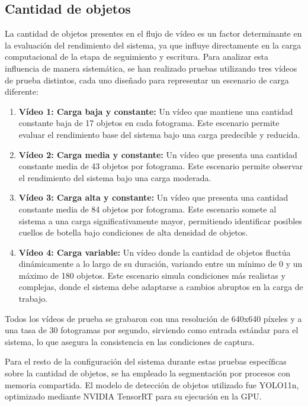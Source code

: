 \documentclass[11pt,spanish,listoffigures,listoftables]{tfgetsinf}
\begin{document}
\subsection{Cantidad de objetos} \label{sec:cantidad_objetos}
La cantidad de objetos presentes en el flujo de vídeo es un factor determinante en la evaluación del rendimiento del sistema, ya que influye directamente en la carga computacional de la etapa de seguimiento y escritura. Para analizar esta influencia de manera sistemática, se han realizado pruebas utilizando tres vídeos de prueba distintos, cada uno diseñado para representar un escenario de carga diferente:
\begin{enumerate}


   \item \textbf{Vídeo 1: Carga baja y constante:} Un vídeo que mantiene una cantidad constante baja de 17 objetos en cada fotograma. Este escenario permite evaluar el rendimiento base del sistema bajo una carga predecible y reducida.
   \item \textbf{Vídeo 2: Carga media y constante:} Un vídeo que presenta una cantidad constante media de 43 objetos por fotograma. Este escenario permite observar el rendimiento del sistema bajo una carga moderada.
   \item \textbf{Vídeo 3: Carga alta y constante:} Un vídeo que presenta una cantidad constante media de 84 objetos por fotograma. Este escenario somete al sistema a una carga significativamente mayor, permitiendo identificar posibles cuellos de botella bajo condiciones de alta densidad de objetos.
   \item \textbf{Vídeo 4: Carga variable:} Un vídeo donde la cantidad de objetos fluctúa dinámicamente a lo largo de su duración, variando entre un mínimo de 0 y un máximo de 180 objetos. Este escenario simula condiciones más realistas y complejas, donde el sistema debe adaptarse a cambios abruptos en la carga de trabajo.
\end{enumerate}
Todos los vídeos de prueba se grabaron con una resolución de 640x640 píxeles y a una tasa de 30 fotogramas por segundo, sirviendo como entrada estándar para el sistema, lo que asegura la consistencia en las condiciones de captura.

Para el resto de la configuración del sistema durante estas pruebas específicas sobre la cantidad de objetos, se ha empleado la segmentación por procesos con memoria compartida. El modelo de detección de objetos utilizado fue YOLO11n, optimizado mediante NVIDIA TensorRT para su ejecución en la GPU.
\end{document}
